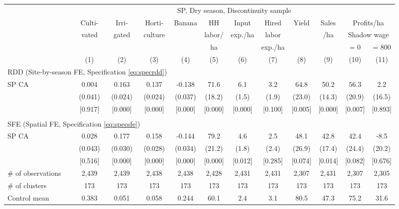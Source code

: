 \begin{tabular}{lccccccccccc}
\hline \hline
 & \multicolumn{11}{c}{SP, Dry season, Discontinuity sample} \\
\cmidrule(lr){2-12}
 & Culti- & Irri- & Horti- & Banana & HH & Input & Hired & Yield & Sales & \multicolumn{2}{c}{Profits/ha} \\
 & vated & gated & culture & & labor/ & exp./ha & labor & & /ha & \multicolumn{2}{c}{Shadow wage} \\
 & & & & & ha & & exp./ha & & & = 0 & = 800 \\
\cmidrule(lr){2-2}\cmidrule(lr){3-3}\cmidrule(lr){4-4}\cmidrule(lr){5-5}\cmidrule(lr){6-6}\cmidrule(lr){7-7}\cmidrule(lr){8-8}\cmidrule(lr){9-9}\cmidrule(lr){10-10}\cmidrule(lr){11-11}\cmidrule(lr){12-12}
 & (1) & (2) & (3) & (4) & (5) & (6) & (7) & (8) & (9) & (10) & (11) \\
\hline
\multicolumn{4}{l}{RDD (Site-by-season FE, Specification \ref{eq:specrdd})} & & & & & & & & \\
\cmidrule(lr){1-4}
SP CA & 0.004 & 0.163 & 0.137 & -0.138\hphantom{-} & 71.6 & 6.1 & 3.2 & 64.8 & 50.2 & 56.3 & 2.2 \\
 & (0.041) & (0.024) & (0.024) & (0.037) & (18.2) & (1.5) & (1.9) & (23.0) & (14.3) & (20.9) & (16.5) \\
 & [0.917] & [0.000] & [0.000] & [0.000] & [0.000] & [0.000] & [0.100] & [0.005] & [0.000] & [0.007] & [0.893] \\
\\[-0.5em]
\multicolumn{4}{l}{SFE (Spatial FE, Specification \ref{eq:specsfe})} & & & & & & & & \\
\cmidrule(lr){1-4}
SP CA & 0.028 & 0.177 & 0.158 & -0.144\hphantom{-} & 79.2 & 4.6 & 2.5 & 48.1 & 42.8 & 42.4 & -8.5\hphantom{-} \\
 & (0.043) & (0.030) & (0.028) & (0.034) & (21.2) & (1.8) & (2.4) & (26.9) & (17.4) & (24.4) & (20.2) \\
 & [0.516] & [0.000] & [0.000] & [0.000] & [0.000] & [0.012] & [0.285] & [0.074] & [0.014] & [0.082] & [0.676] \\
\hline
\# of observations & 2,439 & 2,439 & 2,438 & 2,438 & 2,428 & 2,431 & 2,431 & 2,307 & 2,431 & 2,307 & 2,305 \\
\# of clusters & 173 & 173 & 173 & 173 & 173 & 173 & 173 & 173 & 173 & 173 & 173 \\
Control mean & 0.383 & 0.051 & 0.058 & 0.244 & 60.1 & 2.4 & 3.1 & 80.5 & 47.3 & 75.2 & 31.6 \\
\hline
\end{tabular}

